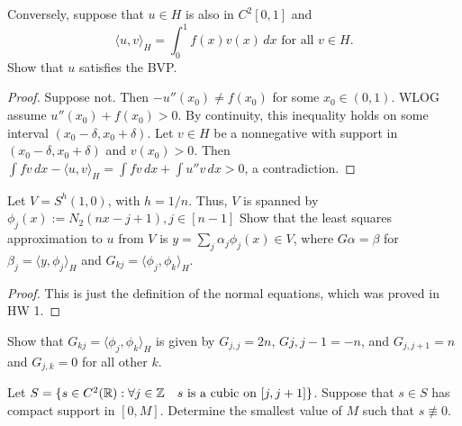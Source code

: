 \documentclass{article}
\begin{document}
 Conversely, suppose that $u \in H$ is also in $C^2[0,1]$ and 
$$\langle u, v \rangle_H  = \int_0^1 f(x) v(x) \, dx \text{ for all } v \in H.$$
Show that $u$ satisfies the BVP.
\begin{proof}
Suppose not. Then $-u''(x_0) \neq f(x_0)$ for some $x_0 \in (0,1)$. WLOG assume $u''(x_0) + f(x_0) > 0$.  By continuity, this inequality holds on some interval $(x_0 - \delta, x_0 + \delta)$. Let $v \in H$ be a nonnegative with support in $(x_0 - \delta, x_0 + \delta)$ and $v(x_0) > 0$.  Then $\int f v \, dx - \langle u, v \rangle_H = \int f v \, dx + \int u'' v \, dx  > 0$, a contradiction.
\end{proof}


 Let $V = S^h(1,0)$, with $h = 1/n$. Thus, $V$ is spanned by $\phi_j(x) := N_2(nx - j+1), j \in [n-1]$ Show that the least squares approximation to $u$ from $V$ is $y = \sum_j \alpha_j \phi_j(x) \in V$, where $G \alpha = \beta$ for $\beta_j = \langle y , \phi_j \rangle_H$ and $G_{kj} = \langle \phi_j, \phi_k \rangle_H$.

\begin{proof}
This is just the definition of the normal equations, which was proved in HW 1.
\end{proof}

 Show that $G_{kj} = \langle \phi_j, \phi_k \rangle_H$ is given by
$G_{j,j} = 2n$, $G{j,j-1} = -n$, and $G_{j, j+1} = n$ and $G_{j,k} = 0$ for all other $k$.



 Let $S = \{ s \in C^2(\mathbb{R}) : \forall j \in \mathbb{Z} \quad s \text{ is a cubic on } [j, j+1] \}$.  Suppose that $s \in S$ has compact support in $[0,M]$. Determine the smallest value of $M$ such that $s \not \equiv 0$.
\end{document}
